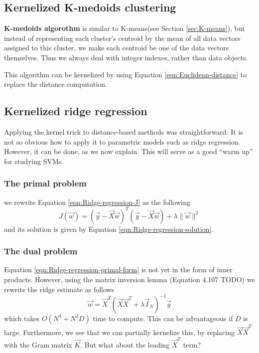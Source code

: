 \subsection{Kernelized K-medoids clustering}
\textbf{K-medoids algorothm} is similar to K-means(see Section \ref{sec:K-means}), but instead of representing each cluster’s centroid by the mean of all data vectors assigned to this cluster, we make each centroid be one of the data vectors themselves. Thus we always deal with integer indexes, rather than data objects.

This algorithm can be kernelized by using Equation \eqref{eqn:Euclidean-distance} to replace the distance computation.


\subsection{Kernelized ridge regression}
Applying the kernel trick to distance-based methods was straightforward. It is not so obvious how to apply it to parametric models such as ridge regression. However, it can be done, as we now explain. This will serve as a good “warm up” for studying SVMs.


\subsubsection{The primal problem}
we rewrite Equation \eqref{eqn:Ridge-regression-J} as the following
\begin{equation}\label{eqn:Ridge-regression-primal-form}
J(\vec{w})=(\vec{y}-\vec{X}\vec{w})^T(\vec{y}-\vec{X}\vec{w})+\lambda\lVert\vec{w}\rVert^2
\end{equation}
and its solution is given by Equation \eqref{eqn:Ridge-regression-solution}.


\subsubsection{The dual problem}
Equation \eqref{eqn:Ridge-regression-primal-form} is not yet in the form of inner products. However, using the matrix inversion lemma (Equation 4.107 TODO) we rewrite the ridge estimate as follows
\begin{equation}
\vec{w}=\vec{X}^T(\vec{X}\vec{X}^T+\lambda\vec{I}_N)^{-1}\vec{y}
\end{equation}
which takes $O(N^3+N^2D)$ time to compute. This can be advantageous if $D$ is large. Furthermore, we see that we can partially kernelize this, by replacing $\vec{X}\vec{X}^T$ with the Gram matrix $\vec{K}$. But what about the leading $\vec{X}^T$ term?

